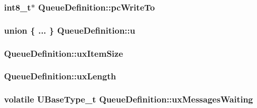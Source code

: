 \hypertarget{structQueueDefinition_abdf13cc013c8488848cee3fce4f0fed3}{
\subsubsection[{pc\-Write\-To}]{\setlength{\rightskip}{0pt plus 5cm}int8\-\_\-t$\ast$ Queue\-Definition\-::pc\-Write\-To}}\label{structQueueDefinition_abdf13cc013c8488848cee3fce4f0fed3}
\hypertarget{structQueueDefinition_a3a2be4f333e88fd5bc1ddb7ae8441e28}{
\subsubsection[{u}]{\setlength{\rightskip}{0pt plus 5cm}union \{ ... \}   Queue\-Definition\-::u}}\label{structQueueDefinition_a3a2be4f333e88fd5bc1ddb7ae8441e28}
\hypertarget{structQueueDefinition_a81bb7d3826909244baa9debf5a55abb0}{
\subsubsection[{ux\-Item\-Size}]{ Queue\-Definition\-::ux\-Item\-Size}}\label{structQueueDefinition_a81bb7d3826909244baa9debf5a55abb0}
\hypertarget{structQueueDefinition_ae80d17a812c669d4d41265b7f693988c}{
\subsubsection[{ux\-Length}]{ Queue\-Definition\-::ux\-Length}}\label{structQueueDefinition_ae80d17a812c669d4d41265b7f693988c}
\hypertarget{structQueueDefinition_a12b07a40152d0f21488ca06d362d13d1}{
\subsubsection[{ux\-Messages\-Waiting}]{\setlength{\rightskip}{0pt plus 5cm}volatile {\bf U\-Base\-Type\-\_\-t} Queue\-Definition\-::ux\-Messages\-Waiting}}\label{structQueueDefinition_a12b07a40152d0f21488ca06d362d13d1}
